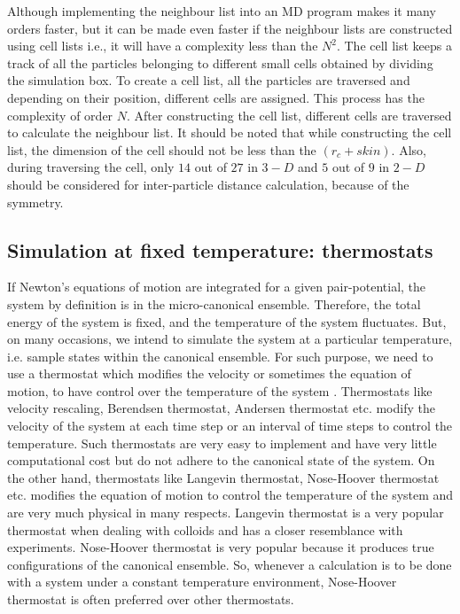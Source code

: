     Although implementing the neighbour list into an MD program makes it many orders faster, but it can be made even faster if the neighbour lists are constructed using cell lists i.e., it will have a complexity less than the $N^2$. The cell list keeps a track of all the particles belonging to different small cells obtained by dividing the simulation box. To create a cell list, all the particles are traversed and depending on their position, different cells are assigned. This process has the complexity of order $N$. After constructing the cell list, different cells are traversed to calculate the neighbour list. It should be noted that while constructing the cell list, the dimension of the cell should not be less than the $(r_c+skin)$. Also, during traversing the cell, only $14$ out of $27$ in $3-D$ and $5$ out of $9$ in $2-D$ should be considered for inter-particle distance calculation, because of the symmetry. 
    
    \subsection{Simulation at fixed temperature: thermostats}\label{thermostat}
    If Newton's equations of motion are integrated for a given pair-potential, the system by definition is in the micro-canonical ensemble. Therefore, the total energy of the system is fixed, and the temperature of the system fluctuates. But, on many occasions, we intend to simulate the system at a particular temperature, i.e. sample states within the canonical ensemble. For such purpose, we need to use a thermostat which modifies the velocity or sometimes the equation of motion, to have control over the temperature of the system \cite{allen2017,frenkel2001understanding}. Thermostats like velocity rescaling, Berendsen thermostat, Andersen thermostat etc. modify the velocity of the system at each time step or an interval of time steps to control the temperature. Such thermostats are very easy to implement and have very little computational cost but do not adhere to the canonical state of the system. On the other hand, thermostats like Langevin thermostat, Nose-Hoover thermostat etc. modifies the equation of motion to control the temperature of the system and are very much physical in many respects. Langevin thermostat is a very popular thermostat when dealing with colloids and has a closer resemblance with experiments. Nose-Hoover thermostat is very popular because it produces true configurations of the canonical ensemble. So, whenever a calculation is to be done with a system under a constant temperature environment,  Nose-Hoover thermostat is often preferred over other thermostats.
    
